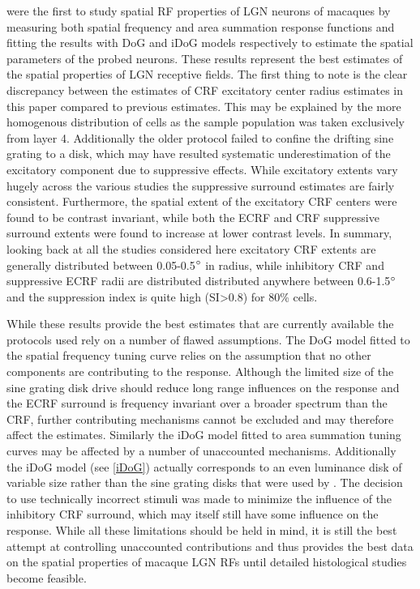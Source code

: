 \cite{Sceniak2006} were the first to study spatial RF properties of
LGN neurons of macaques by measuring both spatial frequency and area
summation response functions and fitting the results with DoG and iDoG
models respectively to estimate the spatial parameters of the probed
neurons. These results represent the best estimates of the spatial
properties of LGN receptive fields. The first thing to note is the
clear discrepancy between the estimates of CRF excitatory center
radius estimates in this paper compared to previous estimates. This
may be explained by the more homogenous distribution of cells as the
sample population was taken exclusively from layer 4. Additionally the
older protocol failed to confine the drifting sine grating to a disk,
which may have resulted systematic underestimation of the excitatory
component due to suppressive effects. While excitatory extents vary
hugely across the various studies the suppressive surround estimates
are fairly consistent. Furthermore, the spatial extent of the
excitatory CRF centers were found to be contrast invariant, while both
the ECRF and CRF suppressive surround extents were found to increase
at lower contrast levels. In summary, looking back at all the studies
considered here excitatory CRF extents are generally distributed
between 0.05-0.5$\degree$ in radius, while inhibitory CRF and
suppressive ECRF radii are distributed distributed anywhere between
0.6-1.5$\degree$ and the suppression index is quite high
(SI\textgreater0.8) for 80\% cells.

While these results provide the best estimates that are currently
available the protocols used rely on a number of flawed
assumptions. The DoG model fitted to the spatial frequency tuning
curve relies on the assumption that no other components are
contributing to the response. Although the limited size of the sine
grating disk drive should reduce long range influences on the response
and the ECRF surround is frequency invariant over a broader spectrum
than the CRF, further contributing mechanisms cannot be excluded and
may therefore affect the estimates. Similarly the iDoG model fitted to
area summation tuning curves may be affected by a number of
unaccounted mechanisms. Additionally the iDoG model (see \ref{iDoG})
actually corresponds to an even luminance disk of variable size rather
than the sine grating disks that were used by \cite{Sceniak2006}. The
decision to use technically incorrect stimuli was made to minimize the
influence of the inhibitory CRF surround, which may itself still have
some influence on the response. While all these limitations should be
held in mind, it is still the best attempt at controlling unaccounted
contributions and thus provides the best data on the spatial
properties of macaque LGN RFs until detailed histological studies
become feasible.

